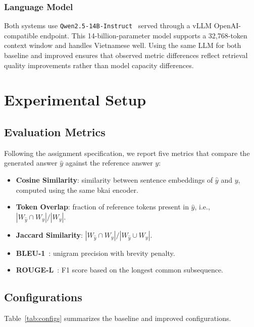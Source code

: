 \documentclass[conference]{IEEEtran}
\begin{document}
\subsubsection{Language Model}

Both systems use \texttt{Qwen2.5-14B-Instruct}~\cite{qwen25} served through a
vLLM OpenAI-compatible endpoint. This 14-billion-parameter model supports a
32,768-token context window and handles Vietnamese well. Using the same LLM for
both baseline and improved ensures that observed metric differences reflect
retrieval quality improvements rather than model capacity differences.

\section{Experimental Setup}

\subsection{Evaluation Metrics}

Following the assignment specification, we report five metrics that compare
the generated answer $\hat{y}$ against the reference answer $y$:

\begin{itemize}
  \item \textbf{Cosine Similarity}: similarity between sentence embeddings of
        $\hat{y}$ and $y$, computed using the same bkai encoder.
  \item \textbf{Token Overlap}: fraction of reference tokens present in $\hat{y}$,
        i.e., $|W_{\hat{y}} \cap W_y| / |W_y|$.
  \item \textbf{Jaccard Similarity}: $|W_{\hat{y}} \cap W_y| / |W_{\hat{y}} \cup W_y|$.
  \item \textbf{BLEU-1}~\cite{papineni2002bleu}: unigram precision with
        brevity penalty.
  \item \textbf{ROUGE-L}~\cite{lin2004rouge}: F1 score based on the longest
        common subsequence.
\end{itemize}

\subsection{Configurations}

Table~\ref{tab:configs} summarizes the baseline and improved configurations.
\end{document}
